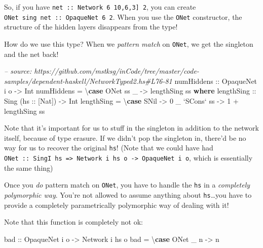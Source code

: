 \documentclass[]{article}
\newenvironment{Shaded}{}{}
\newcommand{\KeywordTok}[1]{\textcolor[rgb]{0.00,0.44,0.13}{\textbf{{#1}}}}
\newcommand{\DataTypeTok}[1]{\textcolor[rgb]{0.56,0.13,0.00}{{#1}}}
\newcommand{\DecValTok}[1]{\textcolor[rgb]{0.25,0.63,0.44}{{#1}}}
\newcommand{\CommentTok}[1]{\textcolor[rgb]{0.38,0.63,0.69}{\textit{{#1}}}}
\newcommand{\OtherTok}[1]{\textcolor[rgb]{0.00,0.44,0.13}{{#1}}}
\newcommand{\FunctionTok}[1]{\textcolor[rgb]{0.02,0.16,0.49}{{#1}}}
\newcommand{\NormalTok}[1]{{#1}}
\begin{document}
So, if you have \texttt{net\ ::\ Network\ 6\ \textquotesingle{}{[}10,6,3{]}\ 2},
you can create \texttt{ONet\ sing\ net\ ::\ OpaqueNet\ 6\ 2}. When you use the
\texttt{ONet} constructor, the structure of the hidden layers disappears from
the type!

How do we use this type? When we \emph{pattern match} on \texttt{ONet}, we get
the singleton and the net back!

\begin{Shaded}
\begin{Highlighting}[]
\CommentTok{-- source: https://github.com/mstksg/inCode/tree/master/code-samples/dependent-haskell/NetworkTyped2.hs#L76-81}
\OtherTok{numHiddens ::} \DataTypeTok{OpaqueNet} \NormalTok{i o }\OtherTok{->} \DataTypeTok{Int}
\NormalTok{numHiddens }\FunctionTok{=} \NormalTok{\textbackslash{}}\KeywordTok{case} \DataTypeTok{ONet} \NormalTok{ss _ }\OtherTok{->} \NormalTok{lengthSing ss}
  \KeywordTok{where}
\OtherTok{    lengthSing ::} \DataTypeTok{Sing} \NormalTok{(}\OtherTok{hs ::} \NormalTok{[}\DataTypeTok{Nat}\NormalTok{]) }\OtherTok{->} \DataTypeTok{Int}
    \NormalTok{lengthSing }\FunctionTok{=} \NormalTok{\textbackslash{}}\KeywordTok{case} \DataTypeTok{SNil}         \OtherTok{->} \DecValTok{0}
                       \NormalTok{_ }\OtherTok{`SCons`} \NormalTok{ss }\OtherTok{->} \DecValTok{1} \FunctionTok{+} \NormalTok{lengthSing ss}
\end{Highlighting}
\end{Shaded}

Note that it's important for us to stuff in the singleton in addition to the
network itself, because of type erasure. If we didn't pop the singleton in,
there'd be no way for us to recover the original \texttt{hs}! (Note that we
could have had
\texttt{ONet\ ::\ SingI\ hs\ =\textgreater{}\ Network\ i\ hs\ o\ -\textgreater{}\ OpaqueNet\ i\ o},
which is essentially the same thing)

Once you \emph{do} pattern match on \texttt{ONet}, you have to handle the
\texttt{hs} in a \emph{completely polymorphic way}. You're not allowed to assume
anything about \texttt{hs}\ldots{}you have to provide a completely
parametrically polymorphic way of dealing with it!

Note that this function is completely not ok:

\begin{Shaded}
\begin{Highlighting}[]
\OtherTok{bad ::} \DataTypeTok{OpaqueNet} \NormalTok{i o }\OtherTok{->} \DataTypeTok{Network} \NormalTok{i hs o}
\NormalTok{bad }\FunctionTok{=} \NormalTok{\textbackslash{}}\KeywordTok{case} \DataTypeTok{ONet} \NormalTok{_ n }\OtherTok{->} \NormalTok{n}
\end{Highlighting}
\end{Shaded}
\end{document}
